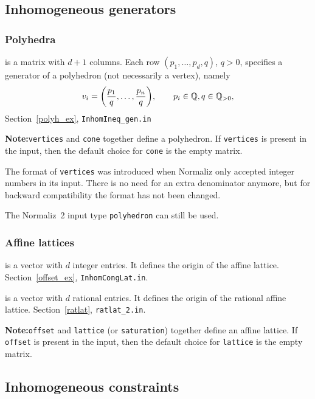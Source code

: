 \subsection{Inhomogeneous generators}

\subsubsection{Polyhedra}

\begin{itemize}
	\itemtt[vertices] is a matrix with $d+1$ columns. Each row $(p_1,\dots,p_d,q)$, $q>0$, specifies a generator of a polyhedron (not necessarily a vertex), namely
	$$
	v_i=\biggl(\frac{p_{1}}{q},\dots,\frac{p_{n}}{q}\biggr), \qquad p_i\in{\mathbb Q},q\in{\mathbb Q}_{>0},
	$$
	Section~\ref{polyh_ex}, \verb|InhomIneq_gen.in|
	
	\textbf{Note:}\enspace \verb|vertices| and \verb|cone| together define a polyhedron. If \verb|vertices| is present in the input, then the default choice for \verb|cone| is the empty matrix.
\end{itemize}

The format of \verb|vertices| was introduced when Normaliz only accepted integer numbers in its input. There is no need for an extra denominator anymore, but for backward compatibility the format has not been changed.

The Normaliz~2 input type \verb|polyhedron| can still be used.

\subsubsection{Affine lattices}

\begin{itemize}
	\itemtt[offset] is a vector with $d$ integer entries. It defines the origin of the affine lattice.
	Section~\ref{offset_ex}, \verb|InhomCongLat.in|.
	
	 is a vector with $d$ rational entries. It defines the origin of the rational affine lattice.
	Section~\ref{ratlat}, \verb|ratlat_2.in|.
\end{itemize}

\textbf{Note:}\enspace \verb|offset| and \verb|lattice| (or \verb|saturation|) together define an affine lattice. If \verb|offset| is present in the input, then the default choice for \verb|lattice| is the empty matrix.

\subsection{Inhomogeneous constraints}

